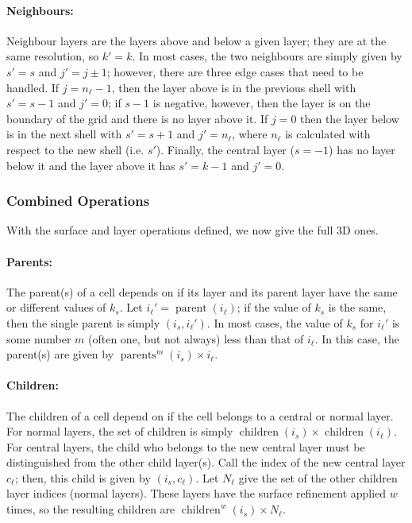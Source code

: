 \paragraph{Neighbours:}
Neighbour layers are the layers above and below a given layer; they are at the same resolution, so $k' = k$.
In most cases, the two neighbours are simply given by $s' = s$ and $j' = j \pm 1$; however, there are three edge cases that need to be handled.
If $j = n_\ell - 1$, then the layer above is in the previous shell with $s' = s - 1$ and $j' = 0$; if $s - 1$ is negative, however, then the layer is on the boundary of the grid and there is no layer above it.
If $j = 0$ then the layer below is in the next shell with $s' = s + 1$ and $j' = n_\ell$, where $n_\ell$ is calculated with respect to the new shell (i.e. $s'$).
Finally, the central layer ($s = -1$) has no layer below it and the layer above it has $s' = k - 1$ and $j' = 0$.


\subsubsection{Combined Operations}
With the surface and layer operations defined, we now give the full 3D ones.


\paragraph{Parents:}
The parent(s) of a cell depends on if its layer and its parent layer have the same or different values of $k_s$.
Let $i_\ell' = \operatorname{parent}(i_\ell)$; if the value of $k_s$ is the same, then the single parent is simply $(i_s, i_\ell')$.
In most cases, the value of $k_s$ for $i_\ell'$ is some number $m$ (often one, but not always) less than that of $i_\ell$.
In this case, the parent(s) are given by $\operatorname{parents}^m(i_s) \times i_\ell$.


\paragraph{Children:}
The children of a cell depend on if the cell belongs to a central or normal layer.
For normal layers, the set of children is simply $\operatorname{children}(i_s) \times \operatorname{children}(i_\ell)$.
For central layers, the child who belongs to the new central layer must be distinguished from the other child layer(s).
Call the index of the new central layer $c_\ell$; then, this child is given by $(i_s, c_\ell)$.
Let $ N_\ell$ give the set of the other children layer indices (normal layers).
These layers have the surface refinement applied $w$ times, so the resulting children are $\operatorname{children}^w(i_s) \times N_\ell$.


